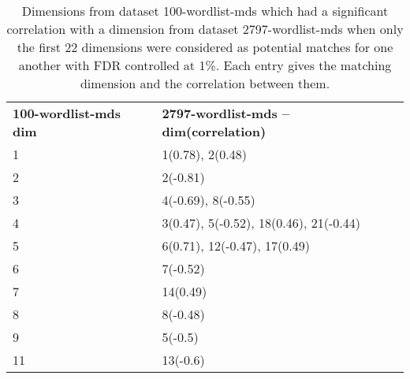 \begin{table}[!tbp]
    \begin{tabular}{| p{0.75in}p{3.5in} |}
        \hline
        \textbf{100-wordlist-mds dim} & \textbf{2797-wordlist-mds -- dim(correlation)}\\
        1 & 1(0.78), 2(0.48)\\
        2 & 2(-0.81)\\
        3 & 4(-0.69), 8(-0.55)\\
        4 & 3(0.47), 5(-0.52), 18(0.46), 21(-0.44)\\
        5 & 6(0.71), 12(-0.47), 17(0.49)\\
        6 & 7(-0.52)\\
        7 & 14(0.49)\\
        8 & 8(-0.48)\\
        9 & 5(-0.5)\\
        11 & 13(-0.6)\\
        \hline
    \end{tabular}
    \caption{Dimensions from dataset 100-wordlist-mds which had a significant correlation with a dimension from dataset 2797-wordlist-mds when only the first 22 dimensions were considered as potential matches for one another with FDR controlled at 1\%. Each entry gives the matching dimension and the correlation between them.}
    \label{100-vs-2797-from-800dim-lowercase-wmt-model-significant-first-22.tex}
\end{table}
